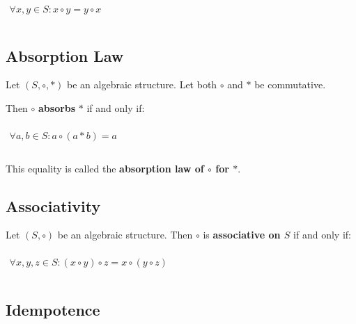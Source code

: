 \begin{math}
  \begin{array}{c}
    \\
    \forall x, y \in S: x \circ y = y \circ x\\
    \\
  \end{array}
\end{math}

\subsection{Absorption Law}
\label{sec:absorption}

Let $(S, \circ, *)$ be an algebraic structure. Let both $\circ$ and
$*$ be commutative.

Then $\circ$ \textbf{absorbs} $*$ if and only if:

\begin{math}
  \begin{array}{c}
    \\
    \forall a, b \in S: a \circ (a * b) = a\\
    \\
  \end{array}
\end{math}

This equality is called the \textbf{absorption law of $\circ$ for
  $*$}.



\subsection{Associativity}
\label{sec:associativity}

Let $(S, \circ)$ be an algebraic structure. Then $\circ$ is
\textbf{associative on $S$} if and only if:

\begin{math}
  \begin{array}{c}
    \\
    \forall x, y, z \in S: (x \circ y) \circ z = x \circ (y \circ z)\\
    \\
  \end{array}
\end{math}


\subsection{Idempotence}
\label{sec:idempotence}

